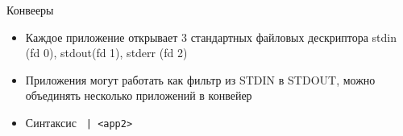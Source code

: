 

\begin{frame}{Конвееры}
  \begin{itemize}
    \item <1-> Каждое приложение открывает 3 стандартных файловых дескриптора stdin (fd 0), stdout(fd 1), stderr (fd 2)
    \item <2-> Приложения могут работать как фильтр из STDIN в STDOUT, можно объединять несколько приложений в конвейер
    \item <2-> Синтаксис {\tt <app1> | <app2>}
  \end{itemize}
\end{frame}
